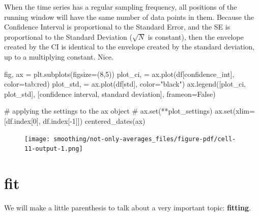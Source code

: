 \documentclass[
  letterpaper,
  DIV=11,
  numbers=noendperiod,
  oneside]{scrreprt}
\newenvironment{Shaded}{\begin{snugshade}}{\end{snugshade}}
\newcommand{\BuiltInTok}[1]{\textcolor[rgb]{0.00,0.23,0.31}{#1}}
\newcommand{\CommentTok}[1]{\textcolor[rgb]{0.37,0.37,0.37}{#1}}
\newcommand{\DecValTok}[1]{\textcolor[rgb]{0.68,0.00,0.00}{#1}}
\newcommand{\NormalTok}[1]{\textcolor[rgb]{0.00,0.23,0.31}{#1}}
\newcommand{\OperatorTok}[1]{\textcolor[rgb]{0.37,0.37,0.37}{#1}}
\newcommand{\StringTok}[1]{\textcolor[rgb]{0.13,0.47,0.30}{#1}}
\newcommand{\VariableTok}[1]{\textcolor[rgb]{0.07,0.07,0.07}{#1}}
\begin{document}
When the time series has a regular sampling frequency, all positions of
the running window will have the same number of data points in them.
Because the Confidence Interval is proportional to the Standard Error,
and the SE is proportional to the Standard Deviation (\(\sqrt{N}\) is
constant), then the envelope created by the CI is identical to the
envelope created by the standard deviation, up to a multiplying
constant. Nice.

\begin{Shaded}
\begin{Highlighting}[]
\NormalTok{fig, ax }\OperatorTok{=}\NormalTok{ plt.subplots(figsize}\OperatorTok{=}\NormalTok{(}\DecValTok{8}\NormalTok{,}\DecValTok{5}\NormalTok{))}
\NormalTok{plot\_ci, }\OperatorTok{=}\NormalTok{ ax.plot(df[}\StringTok{\textquotesingle{}confidence\_int\textquotesingle{}}\NormalTok{], color}\OperatorTok{=}\StringTok{\textquotesingle{}tab:red\textquotesingle{}}\NormalTok{)}
\NormalTok{plot\_std, }\OperatorTok{=}\NormalTok{ ax.plot(df[}\StringTok{\textquotesingle{}std\textquotesingle{}}\NormalTok{], color}\OperatorTok{=}\StringTok{"black"}\NormalTok{)}
\NormalTok{ax.legend([plot\_ci, plot\_std],}
\NormalTok{          [}\StringTok{\textquotesingle{}confidence interval\textquotesingle{}}\NormalTok{, }\StringTok{\textquotesingle{}standard deviation\textquotesingle{}}\NormalTok{],}
\NormalTok{          frameon}\OperatorTok{=}\VariableTok{False}\NormalTok{)}

\CommentTok{\# applying the settings to the ax object}
\CommentTok{\# ax.set(**plot\_settings)}
\NormalTok{ax.}\BuiltInTok{set}\NormalTok{(xlim}\OperatorTok{=}\NormalTok{[df.index[}\DecValTok{0}\NormalTok{], df.index[}\OperatorTok{{-}}\DecValTok{1}\NormalTok{]])}
\NormalTok{centered\_dates(ax)}
\end{Highlighting}
\end{Shaded}

\begin{figure}[H]

{\centering \texttt{[image: smoothing/not-only-averages\_files/figure-pdf/cell-11-output-1.png]}

}

\end{figure}

\hypertarget{fit}{%
\chapter{fit}\label{fit}}

We will make a little parenthesis to talk about a very important topic:
\textbf{fitting}.
\end{document}
